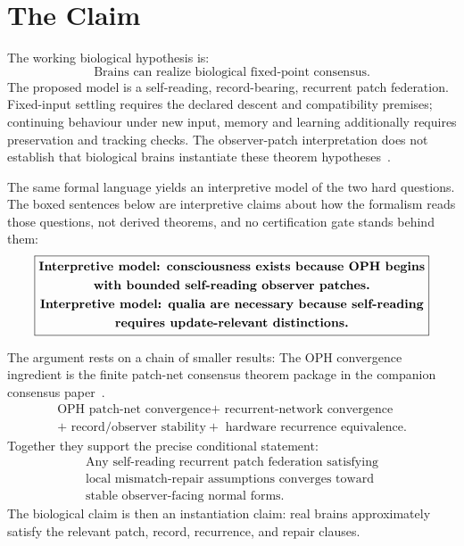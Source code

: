 \documentclass[11pt]{article}
\theoremstyle{remark}
\theoremstyle{plain}
\begin{document}
\tableofcontents

\section{The Claim}

The working biological hypothesis is:
\[
\boxed{
\text{Brains can realize biological fixed-point consensus.}
}
\]
The proposed model is a self-reading, record-bearing, recurrent patch federation.
Fixed-input settling requires the declared descent and compatibility premises;
continuing behaviour under new input, memory and learning additionally requires
preservation and tracking checks. The observer-patch interpretation does not
establish that biological brains instantiate these theorem hypotheses~\cite{ObserversAreAllYouNeed,RealityAsConsensusProtocol}.

The same formal language yields an interpretive model of the two hard
questions. The boxed sentences below are interpretive claims about how the
formalism reads those questions, not derived theorems, and no certification
gate stands behind them:
\[
\boxed{
\begin{gathered}
\text{\bfseries Interpretive model: consciousness exists because OPH begins}\\
\text{\bfseries with bounded self-reading observer patches.}\\
\text{\bfseries Interpretive model: qualia are necessary because self-reading}\\
\text{\bfseries requires update-relevant distinctions.}
\end{gathered}
}
\]

The argument rests on a chain of smaller results:
The OPH convergence ingredient is the finite patch-net consensus theorem package in the companion consensus paper~\cite{RealityAsConsensusProtocol}.
\[
\boxed{
\begin{gathered}
\text{OPH patch-net convergence}
+\text{ recurrent-network convergence}\\
+\text{ record/observer stability}
+\text{ hardware recurrence equivalence}.
\end{gathered}
}
\]
Together they support the precise conditional statement:
\[
\boxed{
\begin{gathered}
\text{Any self-reading recurrent patch federation satisfying}\\
\text{local mismatch-repair assumptions converges toward}\\
\text{stable observer-facing normal forms.}
\end{gathered}
}
\]
The biological claim is then an instantiation claim: real brains approximately satisfy the relevant patch, record, recurrence, and repair clauses.
\end{document}
